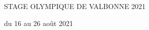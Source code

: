 
\begin{center}\LARGE{\textsc{STAGE OLYMPIQUE DE VALBONNE 2021}}
\vrule depth 0pt height 0.4pt width 16cm\end{center}





\vspace{2cm}


\begin{center}
\end{center}


\vspace*{0.5cm}
\begin{center}du 16 au 26 août 2021\end{center}

